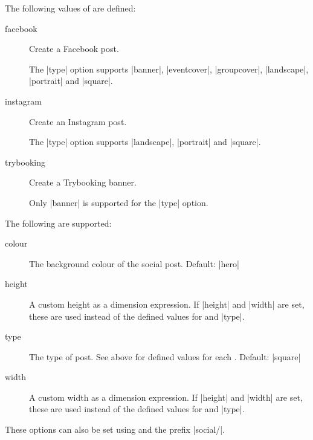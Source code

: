 \documentclass[a4paper]{l3doc}
\begin{document}
The following values of  are defined:

\begin{description}
  \item[facebook] Create a Facebook post.

    The |type| option supports |banner|, |eventcover|, |groupcover|,
    |landscape|, |portrait| and |square|.

  \item[instagram] Create an Instagram post.

    The |type| option supports |landscape|, |portrait| and |square|.

  \item[trybooking] Create a Trybooking banner.

    Only |banner| is supported for the |type| option.
\end{description}

The following  are supported:

\begin{description}
  \item[colour] The background colour of the social post. Default: |hero|
  \item[height] A custom height as a dimension expression. If |height| and
    |width| are set, these are used instead of the defined values for
     and |type|.
  \item[type] The type of post. See above for defined values for each
    . Default: |square|
  \item[width] A custom width as a dimension expression. If |height| and
    |width| are set, these are used instead of the defined values for
     and |type|.
\end{description}

These options can also be set using  and the prefix
|social/|.
\end{document}
